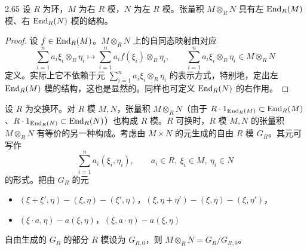 \begin{lemma}{2.65} 设 $R$ 为环，$M$ 为右 $R$ 模，$N$ 为左 $R$ 模。张量积 $M\otimes_R N$ 具有左 $\operatorname{End}_R(M)$ 模、右 $\operatorname{End}_R(N)$ 模的结构。\end{lemma}

\begin{proof}
设 $f\in\operatorname{End}_R(M)$。$M\otimes_R N$ 上的自同态映射由对应
\[
  \sum_{i=1}^n a_i\xi_i\otimes_R\eta_i\mapsto \sum_{i=1}^n a_if(\xi_i)\otimes_R\eta_i,\qquad \sum_{i=1}^n a_i\xi_i\otimes_R\eta_i\in M\otimes_R N
\]
定义。实际上它不依赖于元 $\sum_{i=1}^n a_i\xi_i\otimes_R\eta_i$ 的表示方式，特别地，定出左 $\operatorname{End}_R(M)$ 模的结构，这也是显然的。同样也可定义 $\operatorname{End}_R(N)$ 的右作用。
\end{proof}


设 $R$ 为交换环。对 $R$ 模 $M,N$，张量积 $M\otimes_R N$（由于 $R\cdot1_{\operatorname{End}_R(M)}\subset\operatorname{End}_R(M)$、$R\cdot1_{\operatorname{End}_R(N)}\subset\operatorname{End}_R(N)$）也构成 $R$ 模。$R$ 可换时，$R$ 模 $M,N$ 的张量积 $M\otimes_R N$ 有等价的另一种构成。考虑由 $M\times N$ 的元生成的自由 $R$ 模 $G_R$。其元可写作
\[
  \sum_{i=1}^n a_i(\xi_i,\eta_i),\qquad a_i\in R,\ \xi_i\in M,\ \eta_i\in N
\]
的形式。把由 $G_R$ 的元
\begin{itemize}
  \item $(\xi+\xi',\eta)-(\xi,\eta)-(\xi',\eta)$，$(\xi,\eta+\eta')-(\xi,\eta)-(\xi,\eta')$，
  \item $(\xi\cdot a,\eta)-a(\xi,\eta)$，$(\xi,a\cdot\eta)-a(\xi,\eta)$
\end{itemize}
自由生成的 $G_R$ 的部分 $R$ 模设为 $G_{R,0}$，则 $M\otimes_R N=G_R/G_{R,0}$。



